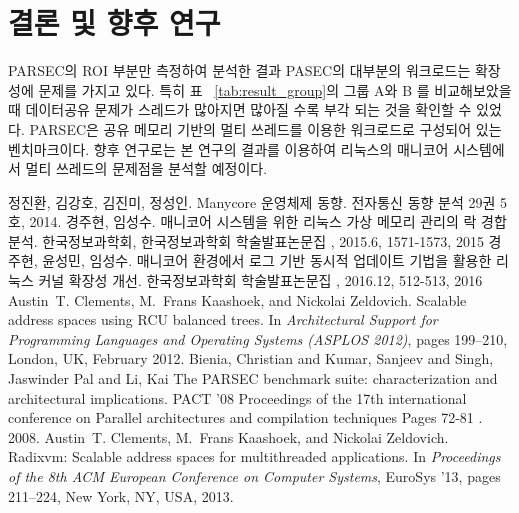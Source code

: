\documentclass{kcc}
\begin{document}
\section{결론 및 향후 연구}

PARSEC의 ROI 부분만 측정하여 분석한 결과 PASEC의 대부분의 워크로드는 확장성에 문제를 
가지고 있다. 특히 표 ~\ref{tab:result_group}의 그룹 A와 B 를 비교해보았을때 데이터공유 문제가 스레드가 많아지면 많아질 수록 부각 되는 것을 확인할 수 있었다.  PARSEC은 공유 메모리 기반의 멀티 쓰레드를 이용한 워크로드로 구성되어 있는 벤치마크이다.
향후 연구로는 본 연구의 결과를 이용하여 리눅스의 매니코어 시스템에서 멀티 쓰레드의 
문제점을 분석할 예정이다.


\begin{thebibliography}{7}
정진환, 김강호, 김진미, 정성인. 
\newblock Manycore 운영체제 동향. 
\newblock 전자통신 동향 분석 29권 5호, 2014. 
경주현, 임성수.
\newblock 매니코어 시스템을 위한 리눅스 가상 메모리 관리의 락 경합 분석. 
\newblock 한국정보과학회, 한국정보과학회 학술발표논문집 , 2015.6, 1571-1573, 2015
경주현, 윤성민, 임성수.
\newblock 매니코어 환경에서 로그 기반 동시적 업데이트 기법을 활용한 리눅스 커널 확장성 개선.
\newblock 한국정보과학회 학술발표논문집 , 2016.12, 512-513, 2016
Austin~T. Clements, M.~Frans Kaashoek, and Nickolai Zeldovich.
\newblock Scalable address spaces using {RCU} balanced trees.
\newblock In {\em Architectural Support for Programming Languages and Operating
  Systems (ASPLOS 2012)}, pages 199--210, London, UK, February 2012.
Bienia, Christian and Kumar, Sanjeev and Singh, Jaswinder Pal and Li, Kai
\newblock The PARSEC benchmark suite: characterization and architectural
implications.
\newblock PACT '08 Proceedings of the 17th international
conference on Parallel architectures and compilation techniques Pages 72-81 . 2008.
Austin~T. Clements, M.~Frans Kaashoek, and Nickolai Zeldovich.
\newblock Radixvm: Scalable address spaces for multithreaded applications.
\newblock In {\em Proceedings of the 8th ACM European Conference on Computer
  Systems}, EuroSys '13, pages 211--224, New York, NY, USA, 2013.

\end{thebibliography}

%
%
\end{document}
